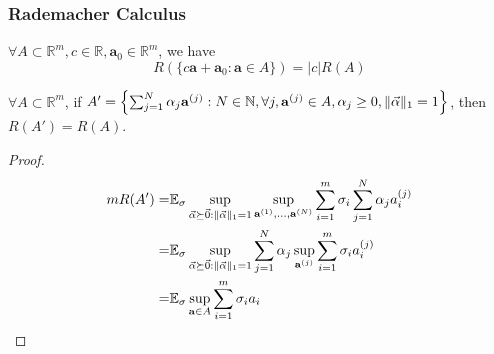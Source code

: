 \subsubsection{Rademacher Calculus}%
\label{sub:rademacher_calculus}

\begin{lemma}
    $ \forall A \subset \mathbb{R}^m, c \in \mathbb{R}, \mathbf{a}_0 \in \mathbb{R}^m $, we have
    \begin{equation}
        R( \{ c \mathbf{a}+ \mathbf{a}_0 : \mathbf{a} \in A \}) = |c| R(A)
    \end{equation}
\end{lemma}

\begin{lemma}
    $ \forall A \subset \mathbb{R}^m $, if $ A' = \left\{ \sum^{N}_{j=1} \alpha_j \mathbf{a}^{(j)} : N \in \mathbb{N}, \forall j, \mathbf{a}^{(j)} \in A, \alpha_j \ge 0, \Arrowvert \vec{\alpha} \Arrowvert_1 = 1 \right\} $, then $ R(A') = R(A) $. 
    \begin{proof}
        \begin{align*}
            m R(A') =& \mathbb{E}_\sigma \sup_{\vec \alpha \succeq \vec 0 : \Arrowvert \vec \alpha \Arrowvert_1 = 1}
            \sup_{\mathbf{a}^{(1)}, \ldots, \mathbf{a}^{(N)}} \sum^{m}_{i=1} \sigma_i \sum^{N}_{j=1} \alpha_j a_i^{(j)}\\
            =& \mathbb{E}_\sigma \sup_{\vec \alpha \succeq \vec 0 : \Arrowvert \vec \alpha \Arrowvert_1 = 1}\sum^{N}_{j=1} \alpha_j \sup_{\mathbf{a}^{(j)}} \sum^{m}_{i=1} \sigma_i a_i^{(j)}\\
            =& \mathbb{E}_\sigma \sup_{\mathbf{a}\in A} \sum^{m}_{i=1} \sigma_i a_i
        \end{align*}
    \end{proof}
\end{lemma}

